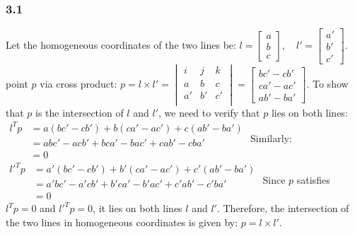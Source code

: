 \documentclass{article}
\begin{document}
\subsubsection*{3.1}
Let the homogeneous coordinates of the two lines be:\newline
$
l = \begin{bmatrix} a \\ b \\ c \end{bmatrix}, \quad l' = \begin{bmatrix} a' \\ b' \\ c' \end{bmatrix}.
$\newline
point $p$ via cross product:\newline
$
p = l \times l' 
= \begin{vmatrix}
    i & j & k\\
    a & b & c\\
    a' & b' & c'\\
\end{vmatrix}
=\begin{bmatrix}
    b c' - c b' \\[1mm] 
    c a' - a c' \\[1mm] 
    a b' - b a' 
\end{bmatrix}.
$\newline
To show that \( p \) is the intersection of \( l \) and \( l' \), we need to verify that \( p \) lies on both lines:\newline
$
\begin{aligned}
    l^T p &= a (b c' - c b') + b (c a' - a c') + c (a b' - b a')\\
    &= a b c' - a c b' + b c a' - b a c' + c a b' - c b a'\\
    &= 0
\end{aligned}
$\newline
Similarly:\newline
$
\begin{aligned}
    l'^T p &= a' (b c' - c b') + b' (c a' - a c') + c' (a b' - b a')\\
    &= a' b c' - a' c b' + b' c a' - b' a c' + c' a b' - c' b a'\\
    &= 0
\end{aligned}
$\newline
Since \( p \) satisfies \( l^T p = 0 \) and \( l'^T p = 0 \), it lies on both lines \( l \) and \( l' \). Therefore, the intersection of the two lines in homogeneous coordinates is given by:
$p = l \times l'$.
\end{document}
